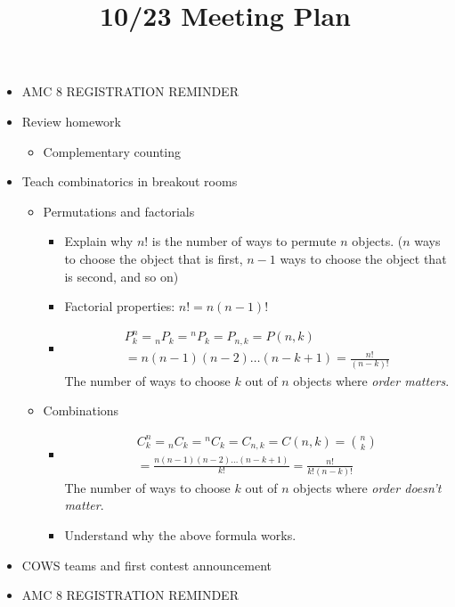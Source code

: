 \documentclass{article}
\title{10/23 Meeting Plan}
\author{}
\date{}
\begin{document}
\begin{itemize}
	\item AMC 8 REGISTRATION REMINDER
	\item Review homework
		\begin{itemize}
			\item Complementary counting
		\end{itemize}
	\item Teach combinatorics in breakout rooms
		\begin{itemize}
			\item Permutations and factorials
				\begin{itemize}
					\item Explain why $n!$ is the number of ways to permute $n$ 
						objects. ($n$ ways to choose the object that is first, 
						$n - 1$ ways to choose the object that is second, and so 
						on)
					\item Factorial properties: $n! = n(n - 1)!$
					\item \begin{multline*}
							P^n_k = {}_nP_k = {}^nP_k = P_{n, k} = P(n, k) \\
							= n(n - 1)(n - 2) \dots (n - k + 1) = \frac{n!}{(n - 
							k)!}
						\end{multline*}
						The number of ways to choose $k$ out of $n$ objects 
						where \emph{order matters}.
				\end{itemize}
			\item Combinations
				\begin{itemize}
					\item \begin{multline*}
							C^n_k = {}_nC_k = {}^nC_k = {}C_{n, k} = C(n, k) = 
							\binom{n}{k} \\
							= \frac{n(n - 1)(n - 2) \dots (n - k + 1)}{k!} = 
							\frac{n!}{k!(n - k)!}
						\end{multline*}
						The number of ways to choose $k$ out of $n$ objects 
						where \emph{order doesn't matter}.
					\item Understand why the above formula works.
				\end{itemize}
		\end{itemize}
		\item COWS teams and first contest announcement
		\item AMC 8 REGISTRATION REMINDER
\end{itemize}
\end{document}

